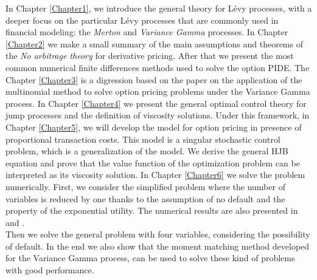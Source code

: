 In Chapter \ref{Chapter1}, we introduce the general theory for Lévy processes, with a deeper focus on the particular Lévy processes that are commonly used in financial modeling:  
the \emph{Merton} and \emph{Variance Gamma} processes.   
In Chapter \ref{Chapter2} we make a small summary of the main assumptions and theorems of the \emph{No arbitrage theory} for derivative pricing. After that we present 
the most common numerical finite differences methods used to solve the option PIDE. 
The Chapter \ref{Chapter3} is a digression based on the paper \cite{Canta2} on the application of the multinomial method to solve option pricing problems under the Variance Gamma process. 
In Chapter \ref{Chapter4} we present the general optimal control theory for jump processes and the definition of viscosity solutions. 
Under this framework, in Chapter \ref{Chapter5}, we will develop the model for option pricing in presence of proportional transaction costs. This model is a singular stochastic
control problem, which is a generalization of the \cite{DaPaZa93} model. We derive the general HJB equation and prove that the value function of the optimization problem 
can be interpreted as its viscosity solution.  
In Chapter \ref{Chapter6} we solve the problem numerically. 
First, we consider the simplified problem where the number of variables is reduced by one thanks to the assumption of no default and the property of the exponential utility. 
The numerical results are also presented in \cite{Canta} and \cite{Matthias}.\\
Then we solve the general problem with four variables, considering the possibility of default. In the end we also show that the moment matching method developed for 
the Variance Gamma process, can be used to solve these kind of problems with good performance. 

